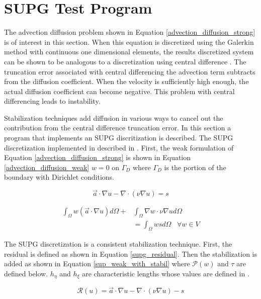 \documentclass[11pt]{article}
\begin{document}
\section{SUPG Test Program}
The advection diffusion problem shown in Equation \ref{advection_diffusion_strong} is of interest in this section. When this equation is discretized using the Galerkin method with continuous one dimensional elements, the results discretized system can be shown to be analogous to a discretization using central difference \cite{fem_for_flow_problems}. The truncation error associated with central differencing the advection term subtracts from the diffusion coefficient. When the velocity is sufficiently high enough, the actual diffusion coefficient can become negative. This problem with central differencing leads to instability.

Stabilization techniques add diffusion in various ways to cancel out the contribution from the central difference truncation error. In this section a program that implements an SUPG discritization is described. The SUPG discretization implemented in described in \cite{fem_for_flow_problems}. First, the weak formulation of Equation \ref{advection_diffusion_strong} is shown in Equation \ref{advection_diffusion_weak} $w=0$ on $\Gamma_D$ where $\Gamma_D$ is the portion of the boundary with Dirichlet conditions.

\begin{equation}
\label{advection_diffusion_strong}
\vec{a} \cdot \nabla u - \nabla \cdot \left( \nu \nabla u \right) = s
\end{equation}

\begin{equation}
\begin{aligned}
\label{advection_diffusion_weak}
\int_\Omega w\left( \vec{a} \cdot \nabla u \right)d\Omega +&\int_\Omega \nabla w \cdot \nu \nabla u d\Omega\\
&= \int_\Omega  wsd\Omega \;\;\; \forall w\in V
\end{aligned}
\end{equation}

The SUPG discretization is a consistent stabilization technique. First, the residual is defined as shown in Equation \ref{supg_residual}. Then the stabilization is added as shown in Equation \ref{sup_weak_with_stabil} where $\mathcal{P}(w)$ and $\tau$ are defined below. $h_\eta$ and $h_\xi$ are characteristic lengths whose values are defined in \cite{fem_for_flow_problems}.

\begin{equation}
\label{supg_residual}
\mathcal{R}(u) = \vec{a} \cdot \nabla u - \nabla \cdot \left( \nu \nabla u \right) - s
\end{equation}
\end{document}
